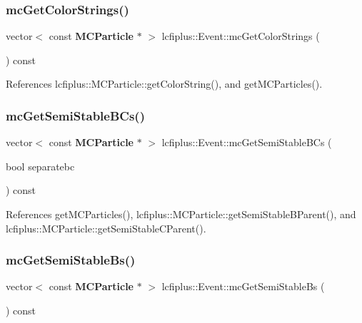 \subsubsection{mc\+Get\+Color\+Strings()}
{\footnotesize\ttfamily vector$<$ const \textbf{ M\+C\+Particle} $\ast$ $>$ lcfiplus\+::\+Event\+::mc\+Get\+Color\+Strings (\begin{DoxyParamCaption}{ }\end{DoxyParamCaption}) const}



References lcfiplus\+::\+M\+C\+Particle\+::get\+Color\+String(), and get\+M\+C\+Particles().

\mbox{\label{classlcfiplus_1_1Event_a6ebdae493ab5e2e264efbf97dfb03ed4}} 
\subsubsection{mc\+Get\+Semi\+Stable\+B\+Cs()}
{\footnotesize\ttfamily vector$<$ const \textbf{ M\+C\+Particle} $\ast$ $>$ lcfiplus\+::\+Event\+::mc\+Get\+Semi\+Stable\+B\+Cs (\begin{DoxyParamCaption}\item[{bool}]{separatebc }\end{DoxyParamCaption}) const}



References get\+M\+C\+Particles(), lcfiplus\+::\+M\+C\+Particle\+::get\+Semi\+Stable\+B\+Parent(), and lcfiplus\+::\+M\+C\+Particle\+::get\+Semi\+Stable\+C\+Parent().

\mbox{\label{classlcfiplus_1_1Event_a83c6b19918f2d2af8e453526938ccd42}} 
\subsubsection{mc\+Get\+Semi\+Stable\+Bs()}
{\footnotesize\ttfamily vector$<$ const \textbf{ M\+C\+Particle} $\ast$ $>$ lcfiplus\+::\+Event\+::mc\+Get\+Semi\+Stable\+Bs (\begin{DoxyParamCaption}{ }\end{DoxyParamCaption}) const}



